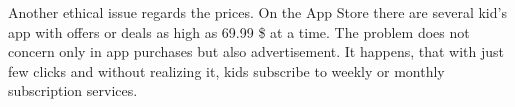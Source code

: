 Another ethical issue regards the prices. On the App Store there are several kid's app with offers or deals as high as 69.99 \$ at a time. The problem does not concern only in app purchases but also advertisement. It happens, that with just few clicks and without realizing it, kids subscribe to weekly or monthly subscription services. 



